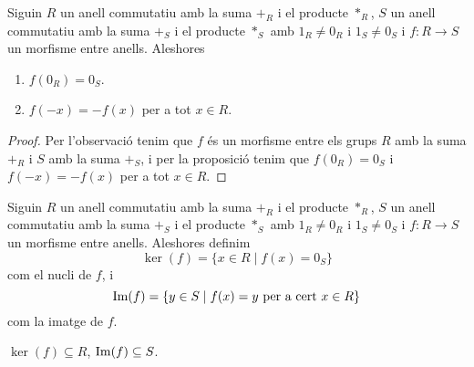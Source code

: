 \documentclass[../Apunts.tex]{subfiles}
\begin{document}
	\begin{proposition}
		\label{prop:propietats morfismes entre anells}
			Siguin \(R\) un anell commutatiu amb la suma \(+_{R}\) i el producte \(\ast_{R}\), \(S\) un anell commutatiu amb la suma \(+_{S}\) i el producte \(\ast_{S}\) amb \(1_{R}\neq0_{R}\) i \(1_{S}\neq0_{S}\) i \(f\colon R\longrightarrow S\) un morfisme entre anells. Aleshores
		\begin{enumerate}
			\item \(f(0_{R})=0_{S}\).
			\item \(f(-x)=-f(x)\) per a tot \(x\in R\).
		\end{enumerate}
		\begin{proof}
			Per l'observació  tenim que \(f\) és un morfisme entre els grups \(R\) amb la suma \(+_{R}\) i \(S\) amb la suma \(+_{S}\), i per la proposició  tenim que \(f(0_{R})=0_{S}\) i \(f(-x)=-f(x)\) per a tot \(x\in R\).
		\end{proof}
	\end{proposition}
	\begin{definition}
		\label{def:nucli d'un morfisme entre anells}
		\label{def:imatge d'un morfisme entre anells}
			Siguin \(R\) un anell commutatiu amb la suma \(+_{R}\) i el producte \(\ast_{R}\), \(S\) un anell commutatiu amb la suma \(+_{S}\) i el producte \(\ast_{S}\) amb \(1_{R}\neq0_{R}\) i \(1_{S}\neq0_{S}\) i \(f\colon R\longrightarrow S\) un morfisme entre anells. Aleshores definim
		\[\ker(f)=\{x\in R\mid f(x)=0_{S}\}\]
		com el nucli de \(f\), i
		\[\operatorname*{Im}(f)=\{y\in S\mid f(x)=y\text{ per a cert }x\in R\}\]
		com la imatge de \(f\).
	\end{definition}
	\begin{observation}
		\label{obs:nucli d'un morfisme entre anells es subconjunt del grup d'entrada, imatge n'és del de sortida}
		\(\ker(f)\subseteq R\), \(\operatorname*{Im}(f)\subseteq S\).
	\end{observation}
\end{document}
